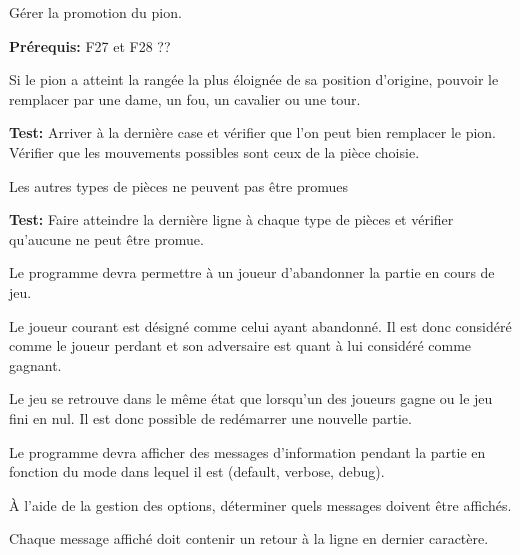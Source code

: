 \documentclass{article}
\begin{document}
\begin{needbox}
    Gérer la promotion du pion.

    \textbf{Prérequis:} F27 et F28 ??
    \begin{subneedbox}
        Si le pion a atteint la rangée la plus éloignée de sa position d'origine, pouvoir le remplacer par
        une dame, un fou, un cavalier ou une tour.

        \textbf{Test:} Arriver à la dernière case et vérifier que l'on peut bien remplacer le pion. 
        Vérifier que les mouvements possibles sont ceux de la pièce choisie.
    \end{subneedbox}
    \begin{subneedbox}
        Les autres types de pièces ne peuvent pas être promues

        \textbf{Test:} Faire atteindre la dernière ligne à chaque type de pièces
         et vérifier qu'aucune ne peut être promue.
    \end{subneedbox}
\end{needbox}

\begin{needbox}[F32: Abandon]
    Le programme devra permettre à un joueur d'abandonner la partie en cours de jeu.
    \begin{subneedbox}[F32.1: Gagnant]
        Le joueur courant est désigné comme celui ayant abandonné.
        Il est donc considéré comme le joueur perdant et son adversaire
        est quant à lui considéré comme gagnant.
    \end{subneedbox}
    \begin{subneedbox}
        Le jeu se retrouve dans le même état que lorsqu'un des joueurs
        gagne ou le jeu fini en nul. Il est donc possible de redémarrer
        une nouvelle partie.
    \end{subneedbox}
\end{needbox}

\begin{needbox}
    Le programme devra afficher des messages d'information
    pendant la partie en fonction du mode dans lequel il est
    (default, verbose, debug).
    \begin{subneedbox}
        À l'aide de la gestion des options, déterminer quels messages doivent être affichés.
    \end{subneedbox}
    \begin{subneedbox}
        Chaque message affiché doit contenir un retour à la ligne en dernier caractère.
    \end{subneedbox}
\end{needbox}
\end{document}

